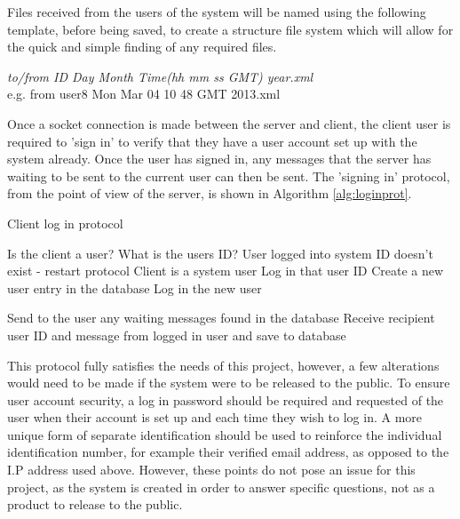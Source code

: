 \documentclass[a4paper,12pt]{report}
\begin{document}
Files received from the users of the system will be named using the following template, before being saved, to create a structure file system which will allow for the quick and simple finding of any required files. 

\begin{center}
 \textit{to/from ID Day Month Time(hh mm ss GMT) year.xml} \\
 e.g. from user8 Mon Mar 04 10 48 GMT 2013.xml
\end{center}

Once a socket connection is made between the server and client, the client user is required to 'sign in' to verify that they have a user account set up with the system already. Once the user has signed in, any messages that the server has waiting to be sent to the current user can then be sent. The 'signing in' protocol, from the point of view of the server, is shown in Algorithm \ref{alg:loginprot}.

\begin{algorithm}
\caption{Client log in protocol}
\label{alg:loginprot}
\begin{algorithmic}
\State Is the client a user?
    \State What is the users ID?
      \State User logged into system
    \Else 
      \State ID doesn't exist - restart protocol
    \EndIf
\Else
      \State Client is a system user
      \State Log in that user ID
    \Else
      \State Create a new user entry in the database
      \State Log in the new user
    \EndIf
\EndIf

\State Send to the user any waiting messages found in the database
\State Receive recipient user ID and message from logged in user and save to database

\end{algorithmic}
\end{algorithm}

This protocol fully satisfies the needs of this project, however, a few alterations would need to be made if the system were to be released to the public. To ensure user account security, a log in password should be required and requested of the user when their account is set up and each time they wish to log in. A more unique form of separate identification should be used to reinforce the individual identification number, for example their verified email address, as opposed to the I.P address used above. However, these points do not pose an issue for this project, as the system is created in order to answer specific questions, not as a product to release to the public. 
\end{document}

